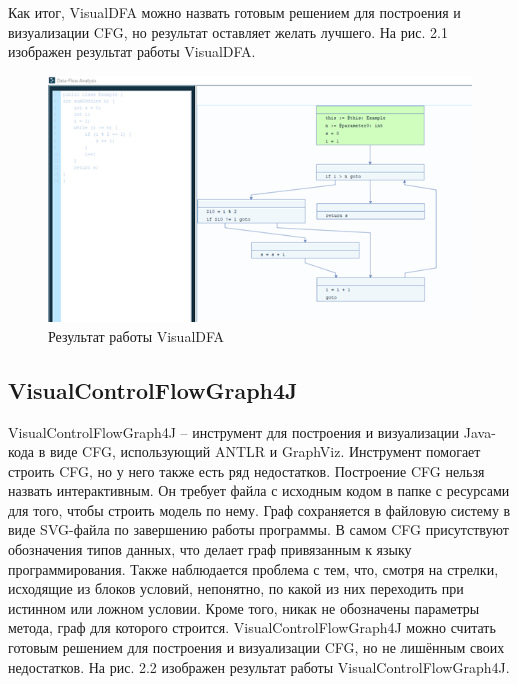 Как итог, VisualDFA можно назвать готовым решением для построения и визуализации CFG, но результат оставляет желать лучшего. На рис. 2.1 изображен результат работы VisualDFA.\\

\begin{figure}[h]
	\center
	\includegraphics [scale=1] {my_folder/images/my/10}
	\caption{Результат работы VisualDFA}
	\label{fig:10}
\end{figure}

\subsection{VisualControlFlowGraph4J} \label{ch2:subsec-title-abbr}
VisualControlFlowGraph4J – инструмент для построения и визуализации Java-кода в виде CFG, использующий ANTLR и GraphViz.
Инструмент помогает строить CFG, но у него также есть ряд недостатков. Построение CFG нельзя назвать интерактивным. Он требует файла с исходным кодом в папке с ресурсами для того, чтобы строить модель по нему. Граф сохраняется в файловую систему в виде SVG-файла по завершению работы программы. В самом CFG присутствуют обозначения типов данных, что делает граф привязанным к языку программирования. Также наблюдается проблема с тем, что, смотря на стрелки, исходящие из блоков условий, непонятно, по какой из них переходить при истинном или ложном условии. Кроме того, никак не обозначены параметры метода, граф для которого строится.
VisualControlFlowGraph4J можно считать готовым решением для построения и визуализации CFG, но не лишённым своих недостатков. На рис. 2.2 изображен результат работы VisualControlFlowGraph4J.

